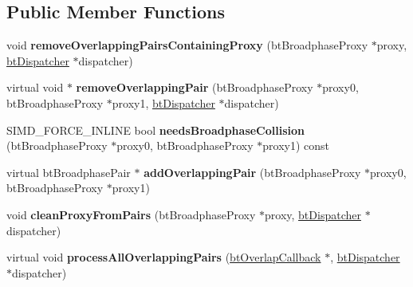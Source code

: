 \subsection*{Public Member Functions}
\begin{DoxyCompactItemize}
\item 
\hypertarget{classbt_hashed_overlapping_pair_cache_a088ca9c8bbd67fe82bb1ac8eb867cecf}{void {\bfseries remove\+Overlapping\+Pairs\+Containing\+Proxy} (bt\+Broadphase\+Proxy $\ast$proxy, \hyperlink{classbt_dispatcher}{bt\+Dispatcher} $\ast$dispatcher)}\label{classbt_hashed_overlapping_pair_cache_a088ca9c8bbd67fe82bb1ac8eb867cecf}

\item 
\hypertarget{classbt_hashed_overlapping_pair_cache_a9f2c753601f361e7ae34755e1938dcda}{virtual void $\ast$ {\bfseries remove\+Overlapping\+Pair} (bt\+Broadphase\+Proxy $\ast$proxy0, bt\+Broadphase\+Proxy $\ast$proxy1, \hyperlink{classbt_dispatcher}{bt\+Dispatcher} $\ast$dispatcher)}\label{classbt_hashed_overlapping_pair_cache_a9f2c753601f361e7ae34755e1938dcda}

\item 
\hypertarget{classbt_hashed_overlapping_pair_cache_af7f1d9bd91c50ffb1234d2f899f96f8c}{S\+I\+M\+D\+\_\+\+F\+O\+R\+C\+E\+\_\+\+I\+N\+L\+I\+N\+E bool {\bfseries needs\+Broadphase\+Collision} (bt\+Broadphase\+Proxy $\ast$proxy0, bt\+Broadphase\+Proxy $\ast$proxy1) const }\label{classbt_hashed_overlapping_pair_cache_af7f1d9bd91c50ffb1234d2f899f96f8c}

\item 
\hypertarget{classbt_hashed_overlapping_pair_cache_a97935b649a0d10f831340d4f46cb82b6}{virtual bt\+Broadphase\+Pair $\ast$ {\bfseries add\+Overlapping\+Pair} (bt\+Broadphase\+Proxy $\ast$proxy0, bt\+Broadphase\+Proxy $\ast$proxy1)}\label{classbt_hashed_overlapping_pair_cache_a97935b649a0d10f831340d4f46cb82b6}

\item 
\hypertarget{classbt_hashed_overlapping_pair_cache_a14f6d7b7b16b7d032f8a9146c337d211}{void {\bfseries clean\+Proxy\+From\+Pairs} (bt\+Broadphase\+Proxy $\ast$proxy, \hyperlink{classbt_dispatcher}{bt\+Dispatcher} $\ast$dispatcher)}\label{classbt_hashed_overlapping_pair_cache_a14f6d7b7b16b7d032f8a9146c337d211}

\item 
\hypertarget{classbt_hashed_overlapping_pair_cache_ae43638685e775e7de716d8b0ecb615ff}{virtual void {\bfseries process\+All\+Overlapping\+Pairs} (\hyperlink{structbt_overlap_callback}{bt\+Overlap\+Callback} $\ast$, \hyperlink{classbt_dispatcher}{bt\+Dispatcher} $\ast$dispatcher)}\label{classbt_hashed_overlapping_pair_cache_ae43638685e775e7de716d8b0ecb615ff}


\end{DoxyCompactItemize}
